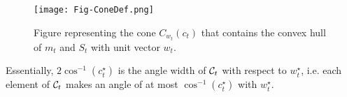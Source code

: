 %

\begin{figure*}
\begin{center}
\texttt{[image: Fig-ConeDef.png]}
\caption{Figure representing the cone $C_{w_t}(c_t)$ that contains the convex hull of $m_t$ and $S_{t}$ with unit vector $w_t$.} 
\label{fig:anglewidthmain}
\end{center}
\end{figure*}


 
Essentially, $2\cos^{-1}(c^\star_t)$ is the angle width of $\mathcal{C}_t$ with respect to $w_t^\star$, i.e. each element of $\mathcal{C}_t$ makes an  angle of at most $ \cos^{-1}(c^\star_t)$ with $w_t^\star$.  
 
 


